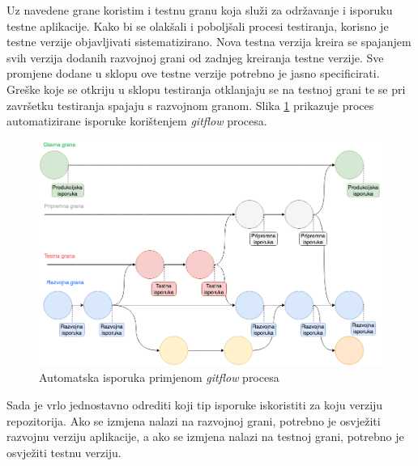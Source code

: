 \documentclass[times, utf8, diplomski, numeric]{fer}
\begin{document}
Uz navedene grane koristim i testnu granu koja služi za održavanje i isporuku testne aplikacije. Kako bi se olakšali i poboljšali procesi testiranja, korisno je testne verzije objavljivati sistematizirano. Nova testna verzija kreira se spajanjem svih verzija dodanih razvojnoj grani od zadnjeg kreiranja testne verzije. Sve promjene dodane u sklopu ove testne verzije potrebno je jasno specificirati. Greške koje se otkriju u sklopu testiranja otklanjaju se na testnoj grani te se pri završetku testiranja spajaju s razvojnom granom. Slika \ref{fig:GitFlowCD} prikazuje proces automatizirane isporuke korištenjem \textit{gitflow} procesa.

\begin{figure}[t!]
\centering
\includegraphics[scale=0.4]{GitFlowCD}
\caption{Automatska isporuka primjenom \textit{gitflow} procesa}
\label{fig:GitFlowCD}
\end{figure}

Sada je vrlo jednostavno odrediti koji tip isporuke iskoristiti za koju verziju repozitorija. Ako se izmjena nalazi na razvojnoj grani, potrebno je osvježiti razvojnu verziju aplikacije, a ako se izmjena nalazi na testnoj grani, potrebno je osvježiti testnu verziju.
\end{document}
